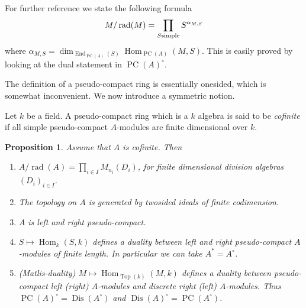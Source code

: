 \documentclass{amsproc}
\DeclareMathOperator{\Dis}{Dis}
\def\rad{\operatorname {rad}}
\def\Hom{\operatorname {Hom}}
\def\End{\operatorname {End}}
\let\oldtext\text
\def\text#1{\oldtext{\upshape #1}}
\DeclareMathOperator{\PC}{PC}
\DeclareMathOperator{\Top}{Top}
\newtheorem{proposition}[lemma]{Proposition}
\theoremstyle{definition}
\theoremstyle{remark}
\numberwithin{equation}{section}
\numberwithin{table}{section}
\numberwithin{figure}{section}
\begin{document}
For further reference we state the following formula
\begin{equation}
\label{ref:4.9b}
M/\rad(M)=\prod_{S\text{ simple}} S^{\alpha_{M,S}}
\end{equation} 
where $\alpha_{M,S}=\dim_{\End_{\PC(A)}(S)}\Hom_{\PC(A)}(M,S)$.
This is easily proved by looking at the dual statement in
$\PC(A)^\circ$.



The definition of a pseudo-compact ring is essentially onesided, which
is somewhat inconvenient. We now introduce a symmetric notion.

Let $k$ be a field. A pseudo-compact ring
which is a $k$ algebra is said to be \emph{cofinite} if all simple
pseudo-compact $A$-modules are finite dimensional over $k$.
\begin{proposition} \label{ref:4.10a} Assume that $A$ is cofinite. Then
\begin{enumerate}
\item $A/\rad(A)=\prod_{i\in I} M_{n_i}(D_i)$, for finite dimensional
  division algebras $(D_i)_{i\in I}$.
\item
The topology on $A$
is generated by twosided ideals of finite codimension. 
\item $A$ is left and right pseudo-compact.
\item $S\mapsto \Hom_k(S,k)$ defines a duality between left and right
pseudo-compact $A$-modules of finite length. In particular we can take
$A^\ast=A^\circ$.
\item (Matlis-duality) $M\mapsto \Hom_{\Top(k)}(M,k)$ defines a
  duality between pseudo-compact left (right) $A$-modules and discrete
  right (left)
  $A$-modules. Thus $\PC(A)^\circ=\Dis(A^\circ)$ and
  $\Dis(A)^\circ=\PC(A^\circ)$.
\end{enumerate}
\end{proposition}
\end{document}
